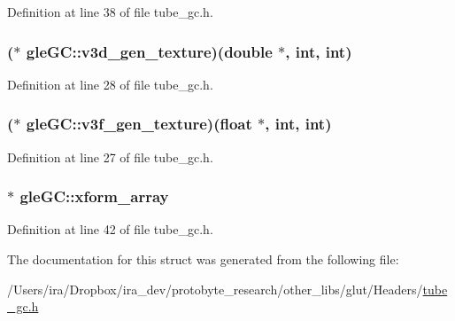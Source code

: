 Definition at line 38 of file tube\-\_\-gc.\-h.

\hypertarget{structgle_g_c_ae971242533f826008c0bf49ca6c01d6f}{
\subsubsection[{v3d\-\_\-gen\-\_\-texture}]{($\ast$ gle\-G\-C\-::v3d\-\_\-gen\-\_\-texture)(double $\ast$, int, int)}}\label{structgle_g_c_ae971242533f826008c0bf49ca6c01d6f}


Definition at line 28 of file tube\-\_\-gc.\-h.

\hypertarget{structgle_g_c_a579255f413ffa4680f7e098a89d168a7}{
\subsubsection[{v3f\-\_\-gen\-\_\-texture}]{($\ast$ gle\-G\-C\-::v3f\-\_\-gen\-\_\-texture)(float $\ast$, int, int)}}\label{structgle_g_c_a579255f413ffa4680f7e098a89d168a7}


Definition at line 27 of file tube\-\_\-gc.\-h.

\hypertarget{structgle_g_c_a4328c949813e476ff496186d437f8fc4}{
\subsubsection[{xform\-\_\-array}]{$\ast$ gle\-G\-C\-::xform\-\_\-array}}\label{structgle_g_c_a4328c949813e476ff496186d437f8fc4}


Definition at line 42 of file tube\-\_\-gc.\-h.



The documentation for this struct was generated from the following file\-:\begin{DoxyCompactItemize}
\item 
/\-Users/ira/\-Dropbox/ira\-\_\-dev/protobyte\-\_\-research/other\-\_\-libs/glut/\-Headers/\hyperlink{tube__gc_8h}{tube\-\_\-gc.\-h}\end{DoxyCompactItemize}

